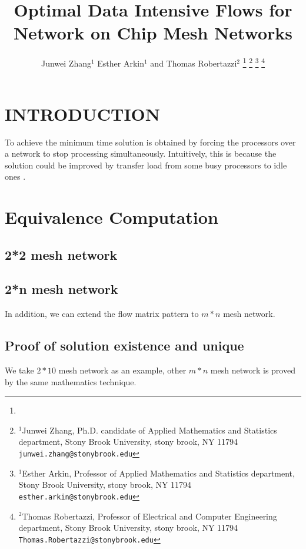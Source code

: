 \documentclass[letterpaper, 10 pt, conference]{ieeeconf}  %
\title{\LARGE \bf
Optimal Data Intensive Flows for Network on Chip Mesh Networks
}
\author{Junwei Zhang$^{1}$ Esther Arkin$^{1}$ and Thomas Robertazzi$^{2}$%
\thanks{}%
\thanks{$^{1}$Junwei Zhang, Ph.D. candidate of Applied Mathematics and Statistics department,
        Stony Brook University, stony brook, NY 11794
        {\tt\small junwei.zhang@stonybrook.edu}}%
\thanks{$^{1}$Esther Arkin, Professor of Applied Mathematics and Statistics department, Stony Brook University,
        stony brook, NY 11794
        {\tt\small esther.arkin@stonybrook.edu}}%
\thanks{$^{2}$Thomas Robertazzi, Professor of Electrical and Computer Engineering department, Stony Brook University,
        stony brook, NY 11794
        {\tt\small Thomas.Robertazzi@stonybrook.edu}}%
}
\begin{document}
\maketitle
\thispagestyle{empty}
\pagestyle{empty}

\begin{abstract}

\end{abstract}

\section{INTRODUCTION}





To achieve the minimum time solution is obtained by forcing the processors over a network to stop processing simultaneously.  Intuitively, this is because the solution could be improved by transfer load from some busy processors to idle ones  \cite{bharadwaj1996scheduling} \cite{sohn1992optimal}.  

\section{Equivalence Computation}

\subsection{2*2 mesh network} 


\subsection{2*n mesh network}

In addition, we can extend the flow matrix pattern to $m*n$ mesh network.

%

\subsection{Proof of solution existence and unique}
We take $2*10$ mesh network as an example, other $m*n$ mesh network is proved by the same mathematics technique.
\end{document}
